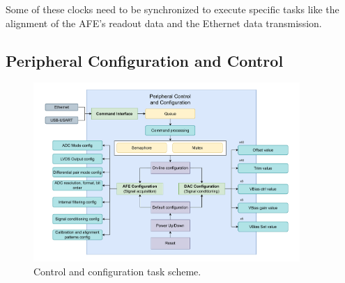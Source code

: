 Some of these clocks need to be synchronized to execute specific tasks like the alignment of the AFE's readout data and the Ethernet data transmission.


\subsection{Peripheral Configuration and Control}



\begin{figure}[htbp]
\centering %
\includegraphics[width=0.9\textwidth,origin=c,angle=0]{Images/ControlTask.pdf}
\caption{\label{fig:InitPeriTask} Control and configuration task scheme.}
\end{figure}









